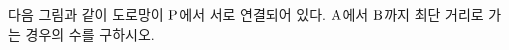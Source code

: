 다음 그림과 같이 도로망이 $\mathrm{P}$에서 서로 연결되어 있다. $\mathrm{A}$에서 $\mathrm{B}$까지 최단 거리로 가는 경우의 수를 구하시오.
\par\smallskip\begin{center}\resizebox{\ifdim\width>\linewidth\linewidth\else\width\fi}{!}{}\end{center}
